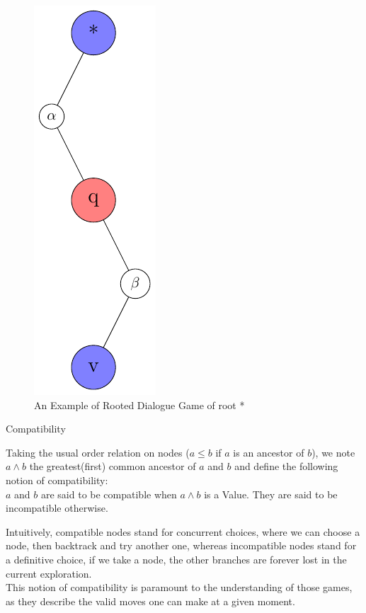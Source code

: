 \documentclass[a4paper,UKenglish]{lipics}
\begin{document}
\begin{figure}\centering\includegraphics[scale=0.6]{dialoguegame1.pdf}\caption{An Example of Rooted Dialogue Game of root *} \end{figure}

\begin{definition}{Compatibility}

Taking the usual order relation on nodes ($a\leq b$ if $a$ is an ancestor of $b$), we note $a\wedge b$ the greatest(first) common ancestor of $a$ and $b$ and define the following notion of compatibility: \\
$a$ and $b$ are said to be compatible when $a\wedge b$ is a Value. They are said to be incompatible otherwise.
 
\end{definition}
Intuitively, compatible nodes stand for concurrent choices, where we can choose a node, then backtrack and try another one, whereas incompatible nodes stand for a definitive choice, if we take a node, the other branches are forever lost in the current exploration. \\

This notion of compatibility is paramount to the understanding of those games, as they describe the valid moves one can make at a given moment.\\
\end{document}
